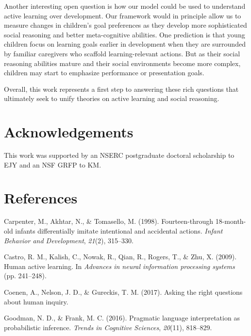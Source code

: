 \documentclass[10pt, letterpaper]{article}
\begin{document}
Another interesting open question is how our model could be used to
understand active learning over development. Our framework would in
principle allow us to measure changes in children's goal preferences as
they develop more sophisticated social reasoning and better
meta-cognitive abilities. One prediction is that young children focus on
learning goals earlier in development when they are surrounded by
familiar caregivers who scaffold learning-relevant actions. But as their
social reasoning abilities mature and their social environments become
more complex, children may start to emphasize performance or
presentation goals.

Overall, this work represents a first step to answering these rich
questions that ultimately seek to unify theories on active learning and
social reasoning.

\section{Acknowledgements}\label{acknowledgements}

This work was supported by an NSERC postgraduate doctoral scholarship to
EJY and an NSF GRFP to KM.

\section{References}\label{references}

\setlength{\parindent}{-0.1in} \setlength{\leftskip}{0.125in}

\noindent

\hypertarget{refs}{}
\hypertarget{ref-carpenter1998fourteen}{}
Carpenter, M., Akhtar, N., \& Tomasello, M. (1998). Fourteen-through
18-month-old infants differentially imitate intentional and accidental
actions. \emph{Infant Behavior and Development}, \emph{21}(2), 315--330.

\hypertarget{ref-castro2009human}{}
Castro, R. M., Kalish, C., Nowak, R., Qian, R., Rogers, T., \& Zhu, X.
(2009). Human active learning. In \emph{Advances in neural information
processing systems} (pp. 241--248).

\hypertarget{ref-coenen2017}{}
Coenen, A., Nelson, J. D., \& Gureckis, T. M. (2017). Asking the right
questions about human inquiry.

\hypertarget{ref-goodman2016}{}
Goodman, N. D., \& Frank, M. C. (2016). Pragmatic language
interpretation as probabilistic inference. \emph{Trends in Cognitive
Sciences}, \emph{20}(11), 818--829.
\end{document}
